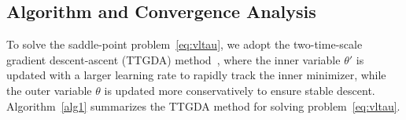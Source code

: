 \documentclass[sigconf]{acmart}
\begin{document}


\subsection{Algorithm and Convergence Analysis}\label{analysis}
To solve the saddle-point problem~\eqref{eq:vltau}, 
we adopt the two-time-scale gradient descent-ascent (TTGDA) method~\cite{lin2020gradient,xu2023unified}, where the inner variable $\theta'$ is updated with a larger learning rate to rapidly track the inner minimizer, while the outer variable $\theta$ is updated more conservatively to ensure stable descent. %
Algorithm~\ref{alg1} summarizes the TTGDA method for solving problem~\eqref{eq:vltau}.
\end{document}
